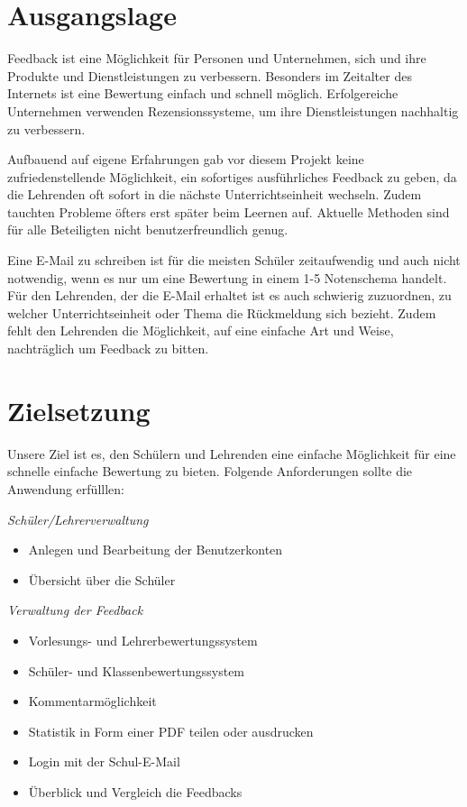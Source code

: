 \section{Ausgangslage}
Feedback ist eine Möglichkeit für Personen und Unternehmen, sich und ihre Produkte und Dienstleistungen zu verbessern. 
Besonders im Zeitalter des Internets ist eine Bewertung einfach und schnell möglich. 
Erfolgereiche Unternehmen verwenden Rezensionssysteme, um ihre Dienstleistungen nachhaltig zu verbessern. 

Aufbauend auf eigene Erfahrungen gab vor diesem Projekt keine zufriedenstellende Möglichkeit, ein sofortiges ausführliches Feedback zu geben, 
da die Lehrenden oft sofort in die nächste Unterrichtseinheit wechseln. Zudem tauchten Probleme öfters erst später beim Leernen auf. 
Aktuelle Methoden sind für alle Beteiligten nicht benutzerfreundlich genug.

Eine E-Mail zu schreiben ist für die meisten Schüler zeitaufwendig und auch nicht notwendig, wenn es nur um eine Bewertung in einem 1-5 Notenschema handelt. 
Für den Lehrenden, der die E-Mail erhaltet ist es auch schwierig zuzuordnen, 
zu welcher Unterrichtseinheit oder Thema die Rückmeldung sich bezieht. Zudem fehlt den Lehrenden die Möglichkeit, auf eine einfache 
Art und Weise, nachträglich um Feedback zu bitten.

\section{Zielsetzung}
Unsere Ziel ist es, den Schülern und Lehrenden eine einfache Möglichkeit für eine schnelle einfache Bewertung zu bieten.
Folgende Anforderungen sollte die Anwendung erfülllen:

\textit{Schüler/Lehrerverwaltung}
\begin{itemize}
    \item Anlegen und Bearbeitung der Benutzerkonten
    \item Übersicht über die Schüler
\end{itemize}

\textit{Verwaltung der Feedback}
\begin{itemize}
    \item Vorlesungs- und Lehrerbewertungssystem
    \item Schüler- und Klassenbewertungssystem
    \item Kommentarmöglichkeit
    \item Statistik in Form einer PDF teilen oder ausdrucken
    \item Login mit der Schul-E-Mail
    \item Überblick und Vergleich die Feedbacks
\end{itemize}

